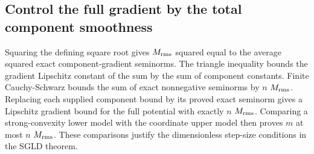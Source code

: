 \documentclass[11pt,a4paper]{report}
\begin{document}
\subsection{\texorpdfstring{Control the full gradient by the total component smoothness}{Control the full gradient by the total component smoothness}}
\label{report-step-AverageLMC-SGLDEstimator-lean-3}


Squaring the defining square root gives \(M_{\rm rms}\) squared equal to the average squared exact component-gradient seminorms. The triangle inequality bounds the gradient Lipschitz constant of the sum by the sum of component constants. Finite Cauchy-Schwarz bounds the sum of exact nonnegative seminorms by \(n\) \(M_{\rm rms}\). Replacing each supplied component bound by its proved exact seminorm gives a Lipschitz gradient bound for the full potential with exactly \(n\) \(M_{\rm rms}\). Comparing a strong-convexity lower model with the coordinate upper model then proves \(m\) at most \(n\) \(M_{\rm rms}\). These comparisons justify the dimensionless step-size conditions in the SGLD theorem.
\end{document}
